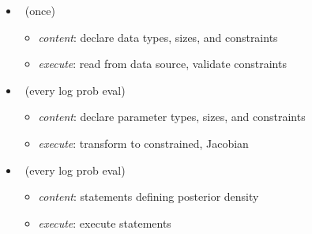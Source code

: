 \documentclass[10pt]{report}
\begin{document}
%
\begin{itemize}
\item {} \ (once)
  \vspace*{-4pt}
  \begin{itemize}\small
  \item {\slshape content}: declare data types, sizes, and constraints
  \item {\slshape execute}: read from data source, validate constraints
  \end{itemize}
\item {} \ (every log prob eval)
  \vspace*{-4pt}
  \begin{itemize}\small
  \item {\slshape content}: declare parameter types, sizes, and constraints
  \item {\slshape execute}: transform to constrained, Jacobian
  \end{itemize}
\item {} \ (every log prob eval)
  \vspace*{-4pt}
  \begin{itemize}\small
  \item {\slshape content}: statements defining posterior density
  \item {\slshape execute}: execute statements
  \end{itemize}
\end{itemize}
\end{document}
